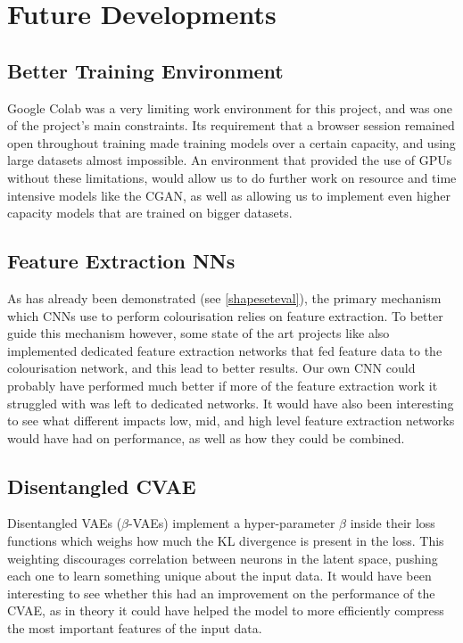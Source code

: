 \documentclass{l4proj}
\begin{document}
\section{Future Developments}
\subsection{Better Training Environment}

Google Colab was a very limiting work environment for this project, and was one of the project's main constraints. Its requirement that a browser session remained open throughout training made training models over a certain capacity, and using large datasets almost impossible. An environment that provided the use of GPUs without these limitations, would allow us to do further work on resource and time intensive models like the CGAN, as well as allowing us to implement even higher capacity models that are trained on bigger datasets.

\subsection{Feature Extraction NNs}

As has already been demonstrated (see \ref{shapeseteval}), the primary mechanism which CNNs use to perform colourisation relies on feature extraction. To better guide this mechanism however, some state of the art projects like \cite{DeepColorization} also implemented dedicated feature extraction networks that fed feature data to the colourisation network, and this lead to better results. Our own CNN could probably have performed much better if more of the feature extraction work it struggled with was left to dedicated networks. It would have also been interesting to see what different impacts low, mid, and high level feature extraction networks would have had on performance, as well as how they could be combined.

\subsection{Disentangled CVAE}

Disentangled VAEs ($\beta$-VAEs) implement a hyper-parameter $\beta$ inside their loss functions which weighs how much the KL divergence is present in the loss. This weighting discourages correlation between neurons in the latent space, pushing each one to learn something unique about the input data\cite{BetaVAE}. It would have been interesting to see whether this had an improvement on the performance of the CVAE, as in theory it could have helped the model to more efficiently compress the most important features of the input data.
\end{document}
